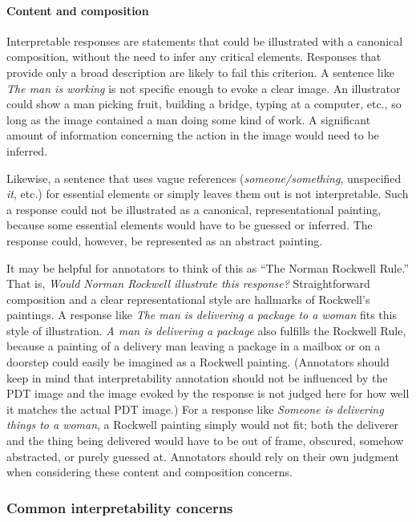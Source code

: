 \documentclass[12pt,notitlepage]{article}
\begin{document}
\paragraph{Content and composition} Interpretable responses are statements that could be illustrated with a canonical composition, without the need to infer any critical elements. Responses that provide only a broad description are likely to fail this criterion. A sentence like \textit{The man is working} is not specific enough to evoke a clear image. An illustrator could show a man picking fruit, building a bridge, typing at a computer, etc., so long as the image contained a man doing some kind of work. A significant amount of information concerning the action in the image would need to be inferred.

Likewise, a sentence that uses vague references (\textit{someone/something}, unspecified \textit{it}, etc.) for essential elements or simply leaves them out is not interpretable. Such a response could not be illustrated as a canonical, representational painting, because some essential elements would have to be guessed or inferred. The response could, however, be represented as an abstract painting. 

It may be helpful for annotators to think of this as ``The Norman Rockwell Rule.'' That is, \textit{Would Norman Rockwell illustrate this response?} Straightforward composition and a clear representational style are hallmarks of Rockwell's paintings. A response like \textit{The man is delivering a package to a woman} fits this style of illustration. \textit{A man is delivering a package} also fulfills the Rockwell Rule, because a painting of a delivery man leaving a package in a mailbox or on a doorstep could easily be imagined as a Rockwell painting. (Annotators should keep in mind that interpretability annotation should not be influenced by the PDT image and the image evoked by the response is not judged here for how well it matches the actual PDT image.) For a response like \textit{Someone is delivering things to a woman}, a Rockwell painting simply would not fit; both the deliverer and the thing being delivered would have to be out of frame, obscured, somehow abstracted, or purely guessed at. Annotators should rely on their own judgment when considering these content and composition concerns.

\subsubsection{Common interpretability concerns}
\end{document}
